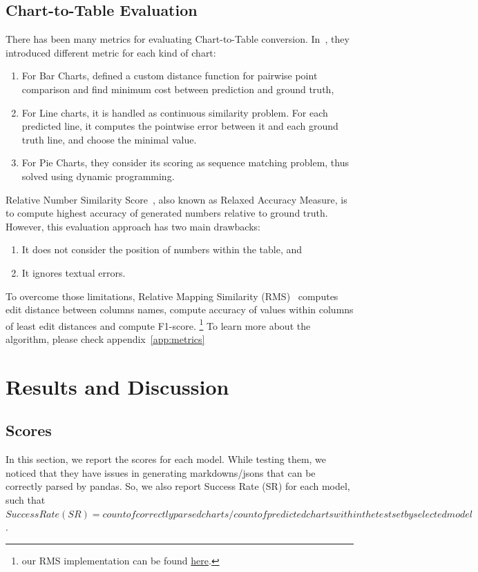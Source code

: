 \documentclass[
	letterpaper, %
]{jdf}
\begin{document}
\subsection{Chart-to-Table Evaluation}\label{ssect:task-evaluation}
There has been many metrics for evaluating Chart-to-Table conversion.
In~\cite{luo2021chartocr}, they introduced different metric for each kind of chart:
\begin{enumerate}
         \item For Bar Charts, defined a custom distance function for pairwise point comparison and find minimum cost between prediction and ground truth,
         \item For Line charts, it is handled as continuous similarity problem.
             For each predicted line, it computes the pointwise error between it and each ground truth line, and choose the minimal value.
         \item For Pie Charts, they consider its scoring as sequence matching problem, thus solved using dynamic programming.
              \end{enumerate}
Relative Number Similarity Score~\cite{masry2022chartqa}, also known as Relaxed Accuracy Measure, is to compute highest accuracy of generated numbers relative to ground truth.
However, this evaluation approach has two main drawbacks:
\begin{enumerate}
         \item It does not consider the position of numbers within the table, and
         \item It ignores textual errors.
              \end{enumerate}
To overcome those limitations, Relative Mapping Similarity (RMS)~\cite{liu2022deplot} computes edit distance between columns names, compute accuracy of values within columns of least edit distances and compute F1-score.
\footnote{our RMS implementation can be found \href{https://github.gatech.edu/mfayed8/GIE-metrics}{here}.}
To learn more about the algorithm, please check appendix~\ref{app:metrics}

\section{Results and Discussion}\label{sect:results}
\subsection{Scores}\label{ssect:rms}
In this section, we report the scores for each model.
While testing them, we noticed that they have issues in generating markdowns/jsons that can be correctly parsed by pandas.
So, we also report Success Rate (SR) for each model, such that $Success Rate (SR) = count of correctly parsed charts/count of predicted charts within the testset by selected model$.
\end{document}
